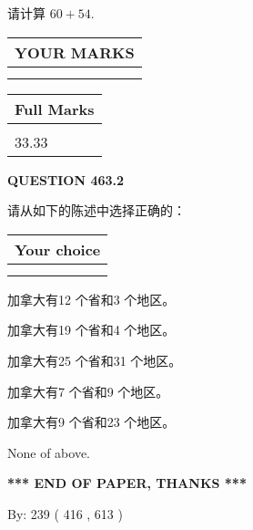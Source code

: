 \documentclass{ctexart}
\begin{document}
  
 
请计算 $ %
60 +  %
54 $.
 

 

 
  
\vspace{0.2in}
  
\noindent\begin{tabular}{|l|}
\hline
 YOUR MARKS  \\
\hline
 \\ 
 \\ 
\hline
\end{tabular}
\hspace{0.05in} \begin{tabular}{|l|}
\hline
 Full Marks  \\
\hline
 \\ 
33.33 \\
\hline
\end{tabular}
{\textbf{\Large{QUESTION
463.2 
}}}
  
  
请从如下的陈述中选择正确的：
  
  
\noindent\hspace{3.0in} \begin{tabular}{|l|}
\hline
Your choice \\
\hline
 \\ 
 \\ 
\hline
\end{tabular}
  
  
 
 
加拿大有12 个省和3 个地区。
 
 
加拿大有19 个省和4 个地区。
 
 
加拿大有25 个省和31 个地区。
 
 
加拿大有7 个省和9 个地区。
 
 
加拿大有9 个省和23 个地区。
 
 
 None of above.
 
 
   
   
 \vspace{0.2in}
 
   
   
   
   
\vspace{1.0in} 
{\textbf{\large{ *** END OF PAPER, THANKS *** }}} 
   
   
\hspace{1.0in} By: 
 239 ( 416 ,  613 )
   
\end{document}
